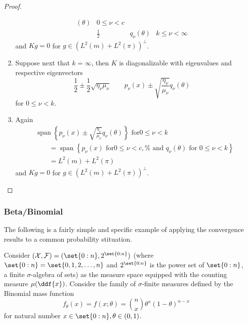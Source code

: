 \documentclass[12pt]{article}
\begin{document}
\begin{proof}
\begin{enumerate}
\begin{align*}
                (\theta) & 0 \le \nu < c\\
                &\frac{1}{2} & q_{\nu}(\theta) & k \le \nu < \infty
            \end{align*}
            and \( Kg = 0 \) for \( g \in (L^2(m) + L^2(\pi))^{\perp} \).
        \item
            Suppose next that \( k = \infty \), then \( K \) is
            diagonalizable with eigenvalues and respective eigenvectors
            \[
                \frac{1}{2} \pm \frac{1}{2} \sqrt{\eta_{\nu} \mu_{\nu}}
                \qquad p_{\nu}(x) \pm \sqrt{\frac{\eta_{\nu}}{\mu_{\nu}}}q_
                {\nu}(\theta)
            \] for \( 0 \le \nu < k \).
        \item
            Again
            \begin{align*}
                &
                \operatorname{span}
                \left\{ p_{\nu}(x) \pm \sqrt{\frac{\eta_{\nu}}{\mu_{\nu}}}
                q_{\nu}(\theta) \right\} \text{ for} 0 \le \nu < k \\
                &\qquad =
                \operatorname{span}
                \left\{ p_{\nu}(x) \text{ for} 0 \le \nu < c, \text{%
                and } q_{\nu}(\theta) \text{ for } 0 \le \nu < k \right\}
                \\
                &\qquad = L^2(m) + L^2(\pi)
            \end{align*}
            and \( Kg = 0 \) for \( g \in (L^2(m) + L^2(\pi))^{\perp} \).
    \end{enumerate}
\end{proof}

\subsubsection*{Beta/Binomial}

The following is a fairly simple and specific example of applying the
convergence results to a common probability stituation.

Consider \( (\mathcal{X}, \mathcal{F}) = (\set{0:n}, 2^{\set{0:n}}) \) (where
\( \set{0:n} = \set{0, 1, 2, \dots, n} \) and \( 2^{\set{0:n}} \) is the
power set of \( \set{0:n} \), a finite \( \sigma \)-algebra of sets) as
the measure space equipped with the counting measure \( \mu(\ddf {x}) \).
Consider the family of \( \sigma \)-finite measures defined by the
Binomial mass function
\[
    f_{\theta}(x) = f(x; \theta) = \binom{n}{x}\theta^x(1-\theta)^{n-x}
\] for natural number \( x \in \set{0:n}, \theta \in (0, 1) \).
\end{document}
